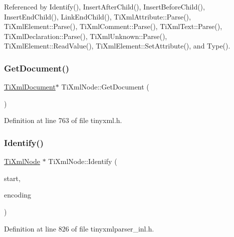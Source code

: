 Referenced by Identify(), Insert\+After\+Child(), Insert\+Before\+Child(), Insert\+End\+Child(), Link\+End\+Child(), Ti\+Xml\+Attribute\+::\+Parse(), Ti\+Xml\+Element\+::\+Parse(), Ti\+Xml\+Comment\+::\+Parse(), Ti\+Xml\+Text\+::\+Parse(), Ti\+Xml\+Declaration\+::\+Parse(), Ti\+Xml\+Unknown\+::\+Parse(), Ti\+Xml\+Element\+::\+Read\+Value(), Ti\+Xml\+Element\+::\+Set\+Attribute(), and Type().

\hypertarget{class_ti_xml_node_a7b2372c0e7adfb32f5b6902fe49a39b2}{}\label{class_ti_xml_node_a7b2372c0e7adfb32f5b6902fe49a39b2} 
\subsubsection{\texorpdfstring{Get\+Document()}{GetDocument()}\hspace{0.1cm}{\footnotesize\ttfamily [2/2]}}
{\footnotesize\ttfamily \hyperlink{class_ti_xml_document}{Ti\+Xml\+Document}$\ast$ Ti\+Xml\+Node\+::\+Get\+Document (\begin{DoxyParamCaption}{ }\end{DoxyParamCaption})\hspace{0.3cm}{\ttfamily [inline]}}



Definition at line 763 of file tinyxml.\+h.

\hypertarget{class_ti_xml_node_ac1e3a8e7578be463b04617786120c2bb}{}\label{class_ti_xml_node_ac1e3a8e7578be463b04617786120c2bb} 
\subsubsection{\texorpdfstring{Identify()}{Identify()}}
{\footnotesize\ttfamily \hyperlink{class_ti_xml_node}{Ti\+Xml\+Node} $\ast$ Ti\+Xml\+Node\+::\+Identify (\begin{DoxyParamCaption}\item[{const char $\ast$}]{start,  }\item[{\hyperlink{tinyxml_8h_a88d51847a13ee0f4b4d320d03d2c4d96}{Ti\+Xml\+Encoding}}]{encoding }\end{DoxyParamCaption})\hspace{0.3cm}{\ttfamily [protected]}}



Definition at line 826 of file tinyxmlparser\+\_\+inl.\+h.




